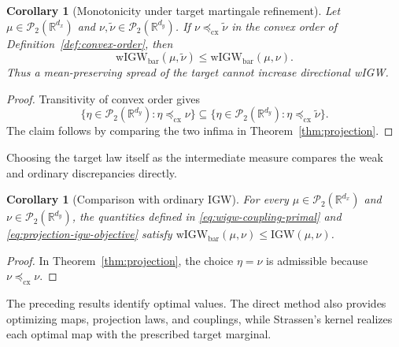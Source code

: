 \documentclass[11pt]{article}
\newcommand{\R}{\mathbb R}
\newcommand{\cP}{\mathcal P}
\newcommand{\cx}{\preceq_{\mathrm{cx}}}
\newcommand{\wIGW}{\mathrm{wIGW}_{\mathrm{bar}}}
\newcommand{\IGW}{\mathrm{IGW}}
\theoremstyle{plain}
\newtheorem{corollary}[theorem]{Corollary}
\theoremstyle{definition}
\theoremstyle{remark}
\begin{document}
\begin{corollary}[Monotonicity under target martingale refinement]
\label{cor:target-refinement}
Let \(\mu\in\cP_2(\R^{d_x})\) and
\(\nu,\widetilde\nu\in\cP_2(\R^{d_y})\). If
\(\nu\cx\widetilde\nu\) in the convex order of
Definition~\ref{def:convex-order}, then
\[
  \wIGW(\mu,\widetilde\nu)\le \wIGW(\mu,\nu).
\]
Thus a mean-preserving spread of the target cannot increase directional wIGW.
\end{corollary}

\begin{proof}
Transitivity of convex order gives
\[
  \{\eta\in\cP_2(\R^{d_y}):\eta\cx\nu\}\subseteq
  \{\eta\in\cP_2(\R^{d_y}):\eta\cx\widetilde\nu\}.
\]
The claim follows by comparing the two infima in
Theorem~\ref{thm:projection}.
\end{proof}

Choosing the target law itself as the intermediate measure compares the weak and
ordinary discrepancies directly.

\begin{corollary}[Comparison with ordinary IGW]\label{cor:igw-comparison}
For every $\mu\in\cP_2(\R^{d_x})$ and $\nu\in\cP_2(\R^{d_y})$, the
quantities defined in \eqref{eq:wigw-coupling-primal} and
\eqref{eq:projection-igw-objective} satisfy
\(\wIGW(\mu,\nu)\le\IGW(\mu,\nu)\).
\end{corollary}

\begin{proof}
In Theorem~\ref{thm:projection}, the choice $\eta=\nu$ is admissible because
$\nu\cx\nu$.
\end{proof}

The preceding results identify optimal values. The direct method also provides
optimizing maps, projection laws, and couplings, while Strassen's kernel realizes
each optimal map with the prescribed target marginal.
\end{document}
